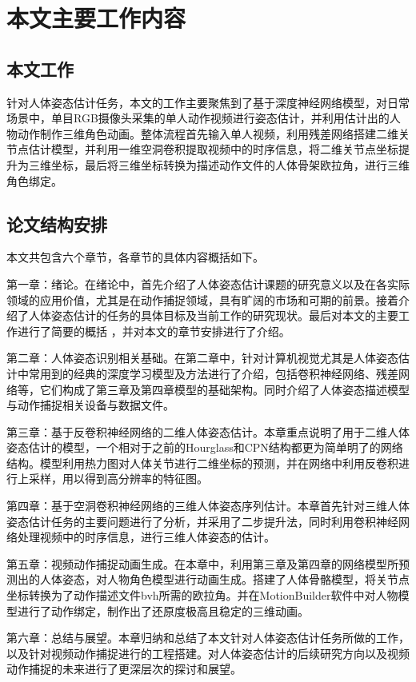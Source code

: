 \section{本文主要工作内容}


\subsection{本文工作}{}
针对人体姿态估计任务，本文的工作主要聚焦到了基于深度神经网络模型，对日常场景中，单目RGB摄像头采集的单人动作视频进行姿态估计，并利用估计出的人物动作制作三维角色动画。整体流程首先输入单人视频，利用残差网络搭建二维关节点估计模型，并利用一维空洞卷积提取视频中的时序信息，将二维关节点坐标提升为三维坐标，最后将三维坐标转换为描述动作文件的人体骨架欧拉角，进行三维角色绑定。

\subsection{论文结构安排}{}
本文共包含六个章节，各章节的具体内容概括如下。

第一章：绪论。在绪论中，首先介绍了人体姿态估计课题的研究意义以及在各实际领域的应用价值，尤其是在动作捕捉领域，具有旷阔的市场和可期的前景。接着介绍了人体姿态估计的任务的具体目标及当前工作的研究现状。最后对本文的主要工作进行了简要的概括 ，并对本文的章节安排进行了介绍。

第二章：人体姿态识别相关基础。在第二章中，针对计算机视觉尤其是人体姿态估计中常用到的经典的深度学习模型及方法进行了介绍，包括卷积神经网络、残差网络等，它们构成了第三章及第四章模型的基础架构。同时介绍了人体姿态描述模型与动作捕捉相关设备与数据文件。

第三章：基于反卷积神经网络的二维人体姿态估计。本章重点说明了用于二维人体姿态估计的模型，一个相对于之前的Hourglass和CPN结构都更为简单明了的网络结构。模型利用热力图对人体关节进行二维坐标的预测，并在网络中利用反卷积进行上采样，用以得到高分辨率的特征图。

第四章：基于空洞卷积神经网络的三维人体姿态序列估计。本章首先针对三维人体姿态估计任务的主要问题进行了分析，并采用了二步提升法，同时利用卷积神经网络处理视频中的时序信息，进行三维人体姿态的估计。

第五章：视频动作捕捉动画生成。在本章中，利用第三章及第四章的网络模型所预测出的人体姿态，对人物角色模型进行动画生成。搭建了人体骨骼模型，将关节点坐标转换为了动作描述文件bvh所需的欧拉角。并在MotionBuilder软件中对人物模型进行了动作绑定，制作出了还原度极高且稳定的三维动画。

第六章：总结与展望。本章归纳和总结了本文针对人体姿态估计任务所做的工作，以及针对视频动作捕捉进行的工程搭建。对人体姿态估计的后续研究方向以及视频动作捕捉的未来进行了更深层次的探讨和展望。



